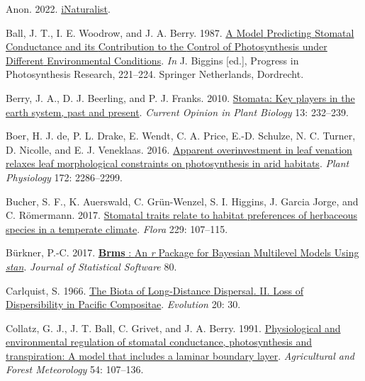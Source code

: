 \documentclass[
  letterpaper,
  DIV=11,
  numbers=noendperiod]{scrartcl}
\newlength{\cslhangindent}
\newlength{\cslentryspacingunit} %
\newenvironment{CSLReferences}[2] %
 {%
  \setlength{\parindent}{0pt}
  \ifodd #1
  \let\oldpar\par
  \def\par{\hangindent=\cslhangindent\oldpar}
  \fi
  \setlength{\parskip}{#2\cslentryspacingunit}
 }%
 {}
\begin{document}
\hypertarget{refs}{}
\begin{CSLReferences}{1}{0}
\leavevmode{}%
Anon. 2022. \href{https://www.inaturalist.org}{{iNaturalist}}.

\leavevmode{}%
Ball, J. T., I. E. Woodrow, and J. A. Berry. 1987.
\href{https://doi.org/10.1007/978-94-017-0519-6_48}{A {Model}
{Predicting} {Stomatal} {Conductance} and its {Contribution} to the
{Control} of {Photosynthesis} under {Different} {Environmental}
{Conditions}}. \emph{In} J. Biggins {[}ed.{]}, Progress in
{Photosynthesis} {Research}, 221--224. Springer Netherlands, Dordrecht.

\leavevmode{}%
Berry, J. A., D. J. Beerling, and P. J. Franks. 2010.
\href{https://doi.org/10.1016/j.pbi.2010.04.013}{Stomata: Key players in
the earth system, past and present}. \emph{Current Opinion in Plant
Biology} 13: 232--239.

\leavevmode{}%
Boer, H. J. de, P. L. Drake, E. Wendt, C. A. Price, E.-D. Schulze, N. C.
Turner, D. Nicolle, and E. J. Veneklaas. 2016.
\href{https://doi.org/10.1104/pp.16.01313}{Apparent overinvestment in
leaf venation relaxes leaf morphological constraints on photosynthesis
in arid habitats}. \emph{Plant Physiology} 172: 2286--2299.

\leavevmode{}%
Bucher, S. F., K. Auerswald, C. Grün-Wenzel, S. I. Higgins, J. Garcia
Jorge, and C. Römermann. 2017.
\href{https://doi.org/10.1016/j.flora.2017.02.011}{Stomatal traits
relate to habitat preferences of herbaceous species in a temperate
climate}. \emph{Flora} 229: 107--115.

\leavevmode{}%
Bürkner, P.-C. 2017.
\href{https://doi.org/10.18637/jss.v080.i01}{\textbf{Brms} : {An}
\emph{r} {Package} for {Bayesian} {Multilevel} {Models} {Using}
\emph{stan}}. \emph{Journal of Statistical Software} 80.

\leavevmode{}%
Carlquist, S. 1966. \href{https://doi.org/10.2307/2406147}{The {Biota}
of {Long}-{Distance} {Dispersal}. {II}. {Loss} of {Dispersibility} in
{Pacific} {Compositae}}. \emph{Evolution} 20: 30.

\leavevmode{}%
Collatz, G. J., J. T. Ball, C. Grivet, and J. A. Berry. 1991.
\href{https://doi.org/10.1016/0168-1923(91)90002-8}{Physiological and
environmental regulation of stomatal conductance, photosynthesis and
transpiration: A model that includes a laminar boundary layer}.
\emph{Agricultural and Forest Meteorology} 54: 107--136.


\end{CSLReferences}
\end{document}
